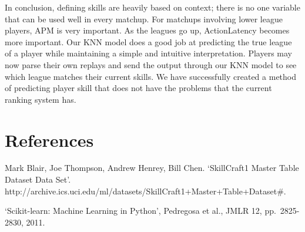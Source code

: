 \documentclass[letterpaper,10pt,english]{/usr/share/sphinx/texinputs/sphinxhowto}
\begin{document}
In conclusion, defining skills are heavily based on context; there is no
one variable that can be used well in every matchup. For matchups
involving lower league players, APM is very important. As the leagues go
up, ActionLatency becomes more important. Our KNN model does a good job
at predicting the true league of a player while maintaining a simple and
intuitive interpretation. Players may now parse their own replays and
send the output through our KNN model to see which league matches their
current skills. We have successfully created a method of predicting
player skill that does not have the problems that the current ranking
system has.\part{References}Mark Blair, Joe Thompson, Andrew Henrey, Bill Chen. `SkillCraft1 Master
Table Dataset Data Set'.
http://archive.ics.uci.edu/ml/datasets/SkillCraft1+Master+Table+Dataset\#.

`Scikit-learn: Machine Learning in Python', Pedregosa et al., JMLR 12,
pp.~2825-2830, 2011.
        

        \renewcommand{\indexname}{Index}
        \printindex

    
\end{document}
